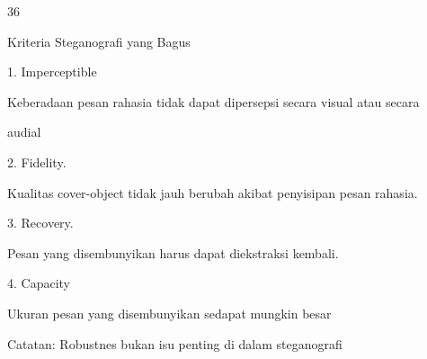 \documentclass{article}
\begin{document}

36

Kriteria Steganografi yang Bagus

1. Imperceptible 


Keberadaan pesan rahasia tidak dapat dipersepsi secara visual atau secara 

audial

2.   Fidelity.


 Kualitas cover-object  tidak jauh berubah akibat penyisipan pesan rahasia. 

3.    Recovery. 


 Pesan yang disembunyikan harus dapat diekstraksi kembali. 

4.    Capacity 


 Ukuran pesan yang disembunyikan sedapat mungkin besar

Catatan: Robustnes bukan isu penting di dalam steganografi
\end{document}
